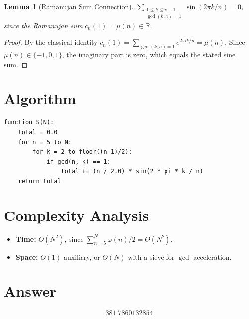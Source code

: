 \documentclass[11pt]{article}
\newtheorem{lemma}[theorem]{Lemma}
\begin{document}
\begin{lemma}[Ramanujan Sum Connection]
$\sum_{\substack{1 \le k \le n-1 \\ \gcd(k,n)=1}} \sin(2\pi k/n) = 0$, since the Ramanujan sum $c_n(1) = \mu(n) \in \mathbb{R}$.
\end{lemma}

\begin{proof}
By the classical identity $c_n(1) = \sum_{\gcd(k,n)=1} e^{2\pi ik/n} = \mu(n)$. Since $\mu(n) \in \{-1, 0, 1\}$, the imaginary part is zero, which equals the stated sine sum.
\end{proof}

\section{Algorithm}

\begin{verbatim}
function S(N):
    total = 0.0
    for n = 5 to N:
        for k = 2 to floor((n-1)/2):
            if gcd(n, k) == 1:
                total += (n / 2.0) * sin(2 * pi * k / n)
    return total
\end{verbatim}

\section{Complexity Analysis}

\begin{itemize}
\item \textbf{Time:} $O(N^2)$, since $\sum_{n=5}^{N} \varphi(n)/2 = \Theta(N^2)$.
\item \textbf{Space:} $O(1)$ auxiliary, or $O(N)$ with a sieve for $\gcd$ acceleration.
\end{itemize}

\section{Answer}

\[
\boxed{381.7860132854}
\]
\end{document}
